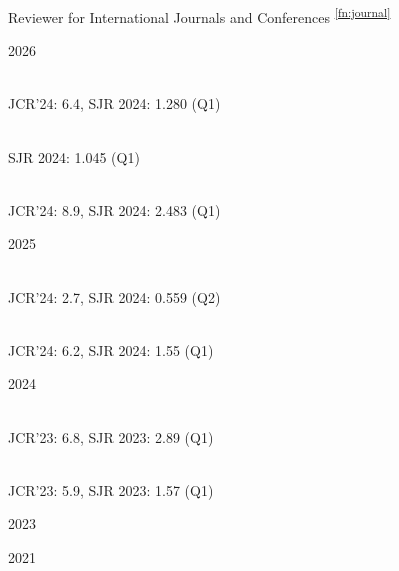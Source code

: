 \documentclass[
	a4paper, %
	10pt, %
]{tresume} %
\begin{document}
\begin{tSection}{Reviewer for International Journals and Conferences \textsuperscript{\ref{fn:journal}}}
  \begin{tSubsection}{2026}{}{}{}
  \item {}\\JCR'24: 6.4, SJR 2024: 1.280 (Q1)
  \item {}\\SJR 2024: 1.045 (Q1)
  \item {}\\JCR'24: 8.9, SJR 2024: 2.483 (Q1)
  \item {}
  \end{tSubsection}
  \begin{tSubsection}{2025}{}{}{}
  \item {}\\JCR'24: 2.7, SJR 2024: 0.559 (Q2)
  \item {}
  \item {}
  \item {}
  \item {}
  \item {}
  \item {}\\JCR'24: 6.2, SJR 2024: 1.55 (Q1)
  \end{tSubsection}
  \begin{tSubsection}{2024}{}{}{}
  \item {}
  \item {}\\JCR'23: 6.8, SJR 2023: 2.89 (Q1)
  \item {}\\JCR'23: 5.9, SJR 2023: 1.57 (Q1)
  \end{tSubsection}
  \begin{tSubsection}{2023}{}{}{}
  \item {}
  \item {}
  \end{tSubsection}
  \begin{tSubsection}{2021}{}{}{}
  \item {}
  \end{tSubsection}
\end{tSection}
\end{document}
